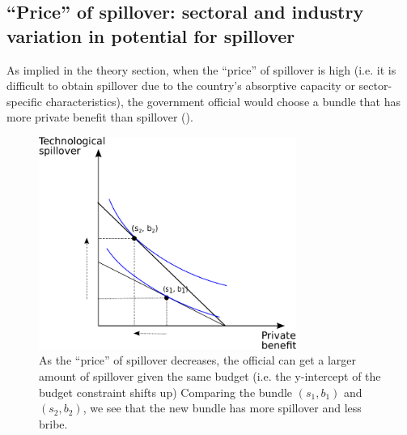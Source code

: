 \subsection{``Price'' of spillover: sectoral and industry variation in potential for spillover}

As implied in the theory section, when the ``price'' of spillover is high (i.e. it is difficult to obtain spillover due to the country's absorptive capacity or sector-specific characteristics), the government official would choose a bundle that has more private benefit than spillover (). 

\begin{figure}[!ht]
	\centering
    \includegraphics[width=0.75\textwidth, height=0.75\textheight,keepaspectratio]{../figure/price_of_spillover}
    \caption{As the ``price'' of spillover decreases, the official can get a larger amount of spillover given the same budget (i.e. the y-intercept of the budget constraint shifts up) Comparing the bundle $(s_1, b_1)$ and $(s_2, b_2)$, we see that the new bundle has more spillover and less bribe.}
    \label{fig:price_of_spillover}
\end{figure}

